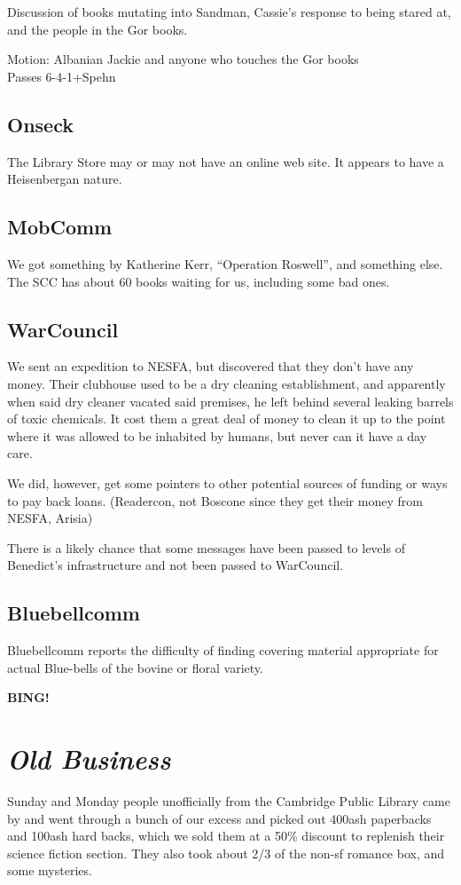 \documentclass[10pt]{article}
\newcommand{\bing}{{\bf BING!} }
\newcommand{\goto}[1]{\bing \vskip 12pt \section*{{\em{#1}}}}
\begin{document}
Discussion of books mutating into Sandman, Cassie's response to being
stared at, and the people in the Gor books.

Motion: Albanian Jackie and anyone who touches the Gor books\\
Passes 6-4-1+Spehn

\subsection*{Onseck}
The Library Store may or may not have an online web site. It appears to
have a Heisenbergan nature.

\subsection*{MobComm}
We got something by Katherine Kerr, ``Operation Roswell'', and something else.
The SCC has about 60 books waiting for us, including some bad ones.

\subsection*{WarCouncil}
We sent an expedition to NESFA, but discovered that they don't have
any money.  Their clubhouse used to be a dry cleaning establishment,
and apparently when said dry cleaner vacated said premises, he left
behind several leaking barrels of toxic chemicals. It cost them a
great deal of money to clean it up to the point where it was allowed
to be inhabited by humans, but never can it have a day care.

We did, however, get some pointers to other potential sources of
funding or ways to pay back loans. (Readercon, not Boscone since they
get their money from NESFA, Arisia)

There is a likely chance that some messages have been passed to levels
of Benedict's infrastructure and not been passed to WarCouncil.

\subsection*{Bluebellcomm}
Bluebellcomm reports the difficulty of finding covering material
appropriate for actual Blue-bells of the bovine or floral variety.

\goto{Old Business} 

Sunday and Monday people unofficially from the Cambridge Public
Library came by and went through a bunch of our excess and picked out
400ash paperbacks and 100ash hard backs, which we sold them at a 50\%
discount to replenish their science fiction section. They also took
about 2/3 of the non-sf romance box, and some mysteries.
\end{document}
